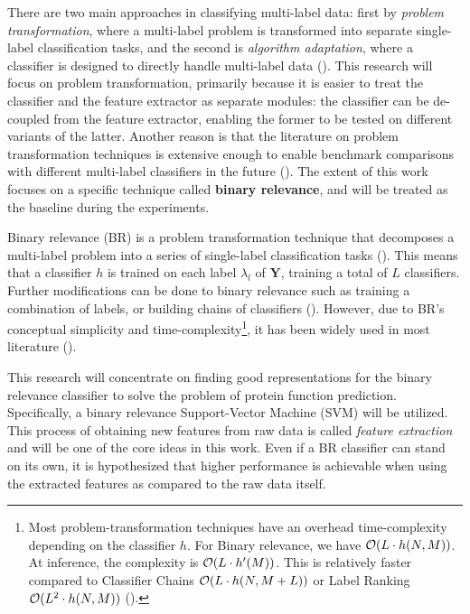 \par There are two main approaches in classifying multi-label data: first by
\textit{problem transformation}, where a multi-label problem is transformed
into separate single-label classification tasks, and the second is
\textit{algorithm adaptation}, where a classifier is designed to 
directly handle multi-label data (\cite{tsoumakas2007multilabel}). This
research will focus on problem transformation, primarily because it is easier
to treat the classifier and the feature extractor as separate modules: the
classifier can be de-coupled from the feature extractor, enabling the former
to be tested on different variants of the latter.  Another reason is that the
literature on problem transformation techniques is extensive enough to
enable benchmark comparisons with different multi-label classifiers in the
future (\cite{zhang2014review, madjarov2012extensive}). The extent
of this work focuses on a specific technique called \textbf{binary relevance},
and will be treated as the baseline during the experiments.

\par Binary relevance (BR) is a problem transformation technique that
decomposes a multi-label problem into a series of single-label classification
tasks (\cite{boutell2004learning, tsoumakas2007multilabel}). This means that a
classifier $h$ is trained on each label $\lambda_l$ of $\mathbf{Y}$, training
a total of $L$ classifiers. Further modifications can be done to binary
relevance such as training a combination of labels, or building chains of
classifiers (\cite{read2009classifier}). However, due to BR's conceptual
simplicity and time-complexity\footnote[2]{
    Most problem-transformation techniques have an overhead time-complexity
    depending on the classifier $h$. For Binary relevance, we have $\mathcal{O}(L
    \cdot h(N, M))$. At inference, the complexity is $\mathcal{O}(L
    \cdot h'(M))$. This is relatively faster compared to Classifier Chains
    $\mathcal{O}(L \cdot h(N, M + L))$ or Label Ranking $\mathcal{O}(L^{2} \cdot h(N, M))$
    (\cite{zhang2014review}).
}, it has been widely used
in most literature (\cite{zhang2017binary}).

\par This research will concentrate on finding good representations for the
binary relevance classifier to solve the problem of protein function
prediction. Specifically, a binary relevance Support-Vector Machine (SVM) will
be utilized. This process of obtaining new features from raw data is called 
\textit{feature extraction} and will be one of the core ideas in this work. Even
if a BR classifier can stand on its own, it is hypothesized that higher
performance is achievable when using the extracted features as compared to the
raw data itself.

